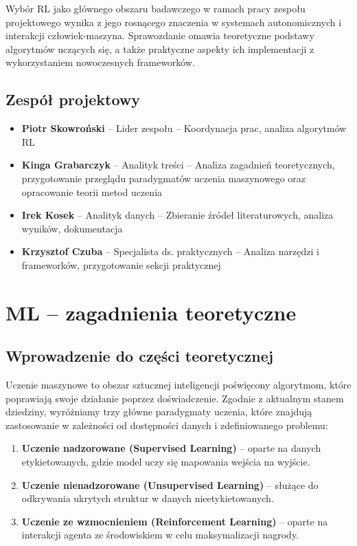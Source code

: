 \documentclass[12pt,a4paper]{article}
\begin{document}
Wybór RL jako głównego obszaru badawczego w ramach pracy zespołu projektowego wynika z jego rosnącego znaczenia w systemach autonomicznych i interakcji człowiek-maszyna. Sprawozdanie omawia teoretyczne podstawy algorytmów uczących się, a także praktyczne aspekty ich implementacji z wykorzystaniem nowoczesnych frameworków.

\subsection{Zespół projektowy}

\begin{itemize}
\item \textbf{Piotr Skowroński} -- Lider zespołu -- Koordynacja prac, analiza algorytmów RL
\item \textbf{Kinga Grabarczyk} -- Analityk treści -- Analiza zagadnień teoretycznych, przygotowanie przeglądu paradygmatów uczenia maszynowego oraz opracowanie teorii metod uczenia
\item \textbf{Irek Kosek} -- Analityk danych -- Zbieranie źródeł literaturowych, analiza wyników, dokumentacja
\item \textbf{Krzysztof Czuba} -- Specjalista ds. praktycznych -- Analiza narzędzi i frameworków, przygotowanie sekcji praktycznej
\end{itemize}

\newpage

\section{ML -- zagadnienia teoretyczne}

\subsection{Wprowadzenie do części teoretycznej}

Uczenie maszynowe to obszar sztucznej inteligencji poświęcony algorytmom, które poprawiają swoje działanie poprzez doświadczenie. Zgodnie z aktualnym stanem dziedziny, wyróżniamy trzy główne paradygmaty uczenia, które znajdują zastosowanie w zależności od dostępności danych i zdefiniowanego problemu:

\begin{enumerate}
    \item \textbf{Uczenie nadzorowane (Supervised Learning)} -- oparte na danych etykietowanych, gdzie model uczy się mapowania wejścia na wyjście.
    \item \textbf{Uczenie nienadzorowane (Unsupervised Learning)} -- służące do odkrywania ukrytych struktur w danych nieetykietowanych.
    \item \textbf{Uczenie ze wzmocnieniem (Reinforcement Learning)} -- oparte na interakcji agenta ze środowiskiem w celu maksymalizacji nagrody.
\end{enumerate}
\end{document}

